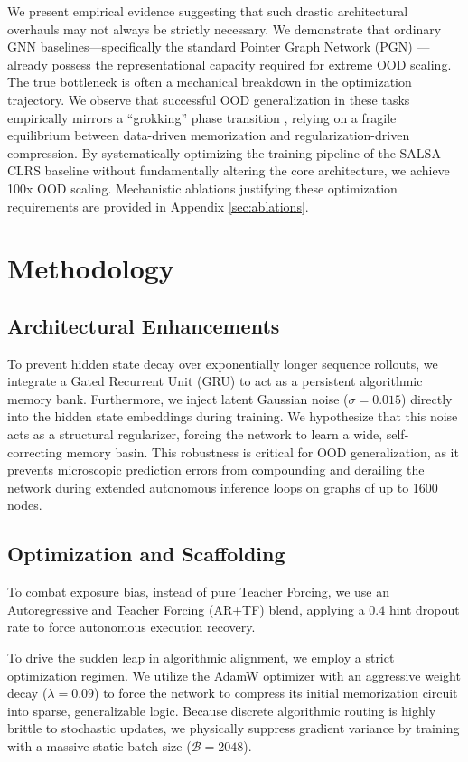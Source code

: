 \documentclass{article}
\begin{document}
We present empirical evidence suggesting that such drastic architectural overhauls may not always be strictly necessary. We demonstrate that ordinary GNN baselines---specifically the standard Pointer Graph Network (PGN) \cite{velickovic2020pointer}---already possess the representational capacity required for extreme OOD scaling. The true bottleneck is often a mechanical breakdown in the optimization trajectory. We observe that successful OOD generalization in these tasks empirically mirrors a ``grokking'' phase transition \cite{power2022grokking}, relying on a fragile equilibrium between data-driven memorization and regularization-driven compression. By systematically optimizing the training pipeline of the SALSA-CLRS baseline without fundamentally altering the core architecture, we achieve 100x OOD scaling. Mechanistic ablations justifying these optimization requirements are provided in Appendix \ref{sec:ablations}.

\section{Methodology}

\subsection{Architectural Enhancements}
To prevent hidden state decay over exponentially longer sequence rollouts, we integrate a Gated Recurrent Unit (GRU) to act as a persistent algorithmic memory bank. Furthermore, we inject latent Gaussian noise ($\sigma = 0.015$) directly into the hidden state embeddings during training. We hypothesize that this noise acts as a structural regularizer, forcing the network to learn a wide, self-correcting memory basin. This robustness is critical for OOD generalization, as it prevents microscopic prediction errors from compounding and derailing the network during extended autonomous inference loops on graphs of up to 1600 nodes.

\subsection{Optimization and Scaffolding}
To combat exposure bias, instead of pure Teacher Forcing, we use an Autoregressive and Teacher Forcing (AR+TF) blend, applying a $0.4$ hint dropout rate to force autonomous execution recovery. 

To drive the sudden leap in algorithmic alignment, we employ a strict optimization regimen. We utilize the AdamW optimizer with an aggressive weight decay ($\lambda=0.09$) to force the network to compress its initial memorization circuit into sparse, generalizable logic. Because discrete algorithmic routing is highly brittle to stochastic updates, we physically suppress gradient variance by training with a massive static batch size ($\mathcal{B}=2048$).
\end{document}
